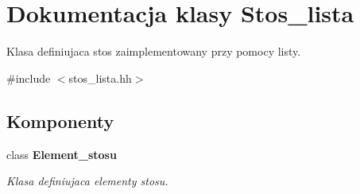 \hypertarget{class_stos__lista}{\section{\-Dokumentacja klasy \-Stos\-\_\-lista}
\label{class_stos__lista}
}


\-Klasa definiujaca stos zaimplementowany przy pomocy listy.  




{\ttfamily \#include $<$stos\-\_\-lista.\-hh$>$}

\subsection*{\-Komponenty}
\begin{DoxyCompactItemize}
\item 
class {\bfseries \-Element\-\_\-stosu}
\begin{DoxyCompactList}\small\item\em \-Klasa definiujaca elementy stosu. \end{DoxyCompactList}\end{DoxyCompactItemize}
